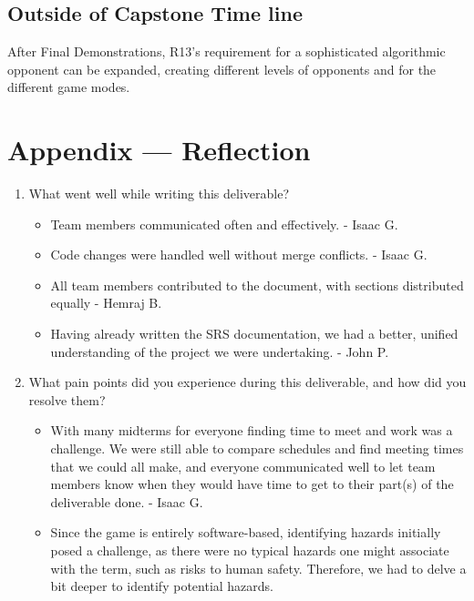\documentclass{article}
\begin{document}
\subsection{Outside of Capstone Time line}
	After Final Demonstrations, R13's requirement for a sophisticated algorithmic opponent can be expanded, creating different levels of opponents and for the different game modes.

\newpage{}

\section*{Appendix --- Reflection}


%

\begin{enumerate}
    \item What went well while writing this deliverable?

    \begin{itemize}
        \item Team members communicated often and effectively. - Isaac G.
        \item Code changes were handled well without merge conflicts. - Isaac G.
        \item All team members contributed to the document, with sections distributed equally - Hemraj B.
        \item Having already written the SRS documentation, we had a better, unified understanding of the project we were undertaking. - John P.
	\end{itemize}

    \item What pain points did you experience during this deliverable, and how
    did you resolve them?

    \begin{itemize}
        \item With many midterms for everyone finding time to meet and work was a challenge. We were still able to compare schedules and find meeting times that we could all make, and everyone communicated well to let team members know when they would have time to get to their part(s) of the deliverable done. - Isaac G.
        \item Since the game is entirely software-based, identifying hazards initially posed a challenge, as there were no typical hazards one might associate with the term, such as risks to human safety. Therefore, we had to delve a bit deeper to identify potential hazards.
	\end{itemize}


\end{enumerate}
\end{document}
